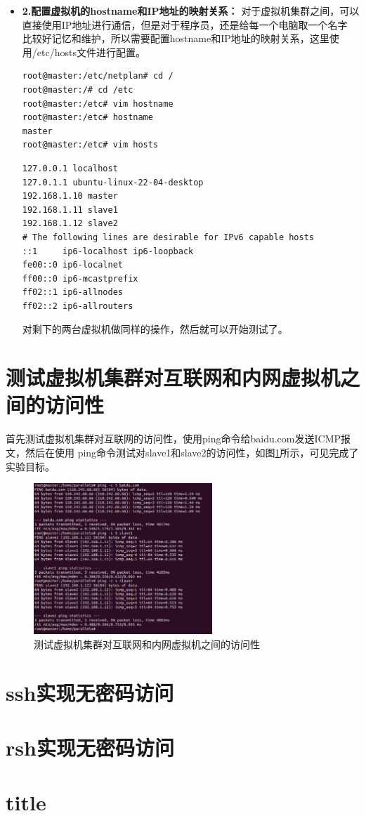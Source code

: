 \documentclass{article}
\begin{document}
\begin{itemize}
\begin{lstlisting}[caption={修改后的00-installer-config.yaml文件内容}]
ethernets:
    enp0s5:
    dhcp4: no
    dhcp6: no
    addresses: [192.168.1.10/24]
    gateway4: 192.168.1.1
    nameservers:
        addresses: [8.8.8.8, 114.114.114.114]
    \end{lstlisting}
    \indent 可以看到上面的虚拟机的IP地址，网关已经修改，对剩下的两台虚拟机做同样的操作即可。
    \item \textbf{2.配置虚拟机的hostname和IP地址的映射关系：}
    对于虚拟机集群之间，可以直接使用IP地址进行通信，但是对于程序员，还是给每一个电脑取一个名字
    比较好记忆和维护，所以需要配置hostname和IP地址的映射关系，这里使用/etc/hosts文件进行配置。
    \begin{lstlisting}[caption={配置hostname和IP地址的映射关系指令}]
root@master:/etc/netplan# cd /
root@master:/# cd /etc
root@master:/etc# vim hostname
root@master:/etc# hostname
master
root@master:/etc# vim hosts
    \end{lstlisting}
    \begin{lstlisting}[caption={修改后的hosts文件内容}]
127.0.0.1 localhost
127.0.1.1 ubuntu-linux-22-04-desktop
192.168.1.10 master
192.168.1.11 slave1
192.168.1.12 slave2
# The following lines are desirable for IPv6 capable hosts
::1     ip6-localhost ip6-loopback
fe00::0 ip6-localnet
ff00::0 ip6-mcastprefix
ff02::1 ip6-allnodes
ff02::2 ip6-allrouters      
    \end{lstlisting}
    \indent 对剩下的两台虚拟机做同样的操作，然后就可以开始测试了。
\end{itemize}
\section{测试虚拟机集群对互联网和内网虚拟机之间的访问性}
\indent 首先测试虚拟机集群对互联网的访问性，使用ping命令给baidu.com发送ICMP报文，然后在使用
ping命令测试对slave1和slave2的访问性，如图\ref{fig:4}所示，可见完成了实验目标。
\begin{figure}[H]
    \centering
    \includegraphics[width=0.6\textwidth]{image3.png}
    \caption{测试虚拟机集群对互联网和内网虚拟机之间的访问性}
    \label{fig:4}
\end{figure}
\section{ssh实现无密码访问}
\indent 

\section{rsh实现无密码访问}
\indent 
\section{title}
\end{document}
